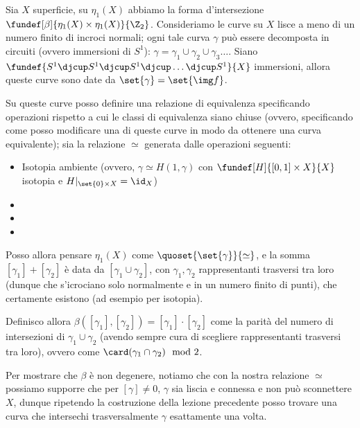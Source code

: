 

\newcommand*\dual{{^\ast}} %
\newcommand*\base[1][B]{\mathcal{#1}} %



Sia $X$ superficie, su $\eta_1(X)$ abbiamo la forma d'intersezione $\fundef[\beta]{\eta_1(X) \times \eta_1(X)}{\Z_2}$. Consideriamo le curve su $X$ lisce a meno di un numero finito di incroci normali; ogni tale curva $\gamma$ può essere decomposta in circuiti (ovvero immersioni di $S^1$): $\gamma = \gamma_1 \cup \gamma_2 \cup \gamma_3 \dots$.
Siano $\fundef{S^1 \djcup S^1 \djcup S^1 \djcup \dots \djcup S^1}{X}$ immersioni, allora queste curve sono date da $\set{\gamma} = \set{\img f}$.

Su queste curve posso definire una relazione di equivalenza specificando operazioni rispetto a cui le classi di equivalenza siano chiuse (ovvero, specificando come posso modificare una di queste curve in modo da ottenere una curva equivalente); sia la relazione $\simeq$ generata dalle operazioni seguenti:
\begin{itemize}
	\item Isotopia ambiente (ovvero, $\gamma \simeq H(1, \gamma)$ con $\fundef[H]{[0,1] \times X}{X}$ isotopia e $H |_{ \set{0} \times X} = \id_X$)
	\newcommand*\INPUTIMAGE[1]{%
		\def\svgwidth{7cm} %
		\item \raisebox{-0.5\height+1ex}{} %
	}
	\INPUTIMAGE{figura36.pdf_tex}
	\INPUTIMAGE{figura37.pdf_tex}
	\INPUTIMAGE{figura38.pdf_tex}
\end{itemize}
Posso allora pensare $\eta_1(X)$ come $\quoset{ \set{\gamma} }{\simeq} $, e la somma $[\gamma_1] + [\gamma_2]$ è data da $[\gamma_1 \cup \gamma_2]$, con $\gamma_1, \gamma_2$ rappresentanti trasversi tra loro (dunque che s'icrociano solo normalmente e in un numero finito di punti), che certamente esistono (ad esempio per isotopia).

Definisco allora $\beta([\gamma_1], [\gamma_2]) = [\gamma_1] \cdot [\gamma_2]$ come la parità del numero di intersezioni di $\gamma_1 \cup \gamma_2$ (avendo sempre cura di scegliere rappresentanti trasversi tra loro), ovvero come $\card(\gamma_1\cap\gamma_2) \mod 2$.

Per mostrare che $\beta$ è non degenere, notiamo che con la nostra relazione $\simeq$ possiamo supporre che per $[\gamma] \neq 0$, $\gamma$ sia liscia e connessa e non può sconnettere $X$, dunque ripetendo la costruzione della lezione precedente posso trovare una curva che intersechi trasversalmente $\gamma$ esattamente una volta.

